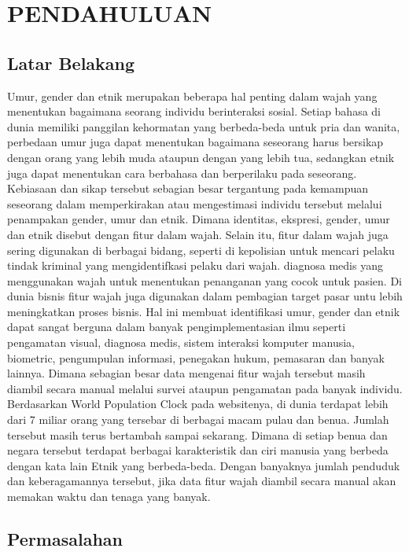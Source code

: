 \section{PENDAHULUAN}

\subsection{Latar Belakang}

Umur, gender dan etnik merupakan beberapa hal penting dalam wajah yang menentukan bagaimana seorang individu berinteraksi sosial. Setiap bahasa di dunia memiliki panggilan kehormatan yang berbeda-beda untuk pria dan wanita, perbedaan umur juga dapat menentukan bagaimana seseorang harus bersikap dengan orang yang lebih muda ataupun dengan yang lebih tua, sedangkan etnik juga dapat menentukan cara berbahasa dan berperilaku pada seseorang. Kebiasaan dan sikap tersebut sebagian besar tergantung pada kemampuan seseorang dalam memperkirakan atau mengestimasi individu tersebut melalui penampakan gender, umur dan etnik. Dimana identitas, ekspresi, gender, umur dan etnik disebut dengan fitur dalam wajah.
Selain itu, fitur dalam wajah juga sering digunakan di berbagai bidang, seperti di kepolisian untuk mencari pelaku tindak kriminal yang mengidentifkasi pelaku dari wajah. diagnosa medis yang menggunakan wajah untuk menentukan penanganan yang cocok untuk pasien. Di dunia bisnis fitur wajah juga digunakan dalam pembagian target pasar untu lebih meningkatkan proses bisnis.
Hal ini membuat identifikasi umur, gender dan etnik dapat sangat berguna dalam banyak pengimplementasian ilmu seperti pengamatan visual, diagnosa medis, sistem interaksi komputer manusia, biometric, pengumpulan informasi, penegakan hukum, pemasaran dan banyak lainnya. Dimana sebagian besar data mengenai fitur wajah tersebut masih diambil secara manual melalui survei ataupun pengamatan pada banyak individu.
Berdasarkan World Population Clock pada websitenya, di dunia terdapat lebih dari 7 miliar orang yang tersebar di berbagai macam pulau dan benua. Jumlah tersebut masih terus bertambah sampai sekarang. Dimana di setiap benua dan negara tersebut terdapat berbagai karakteristik dan ciri manusia yang berbeda dengan kata lain Etnik yang berbeda-beda. Dengan banyaknya jumlah penduduk dan keberagamannya tersebut, jika data fitur wajah diambil secara manual akan memakan waktu dan tenaga yang banyak.


\subsection{Permasalahan}

